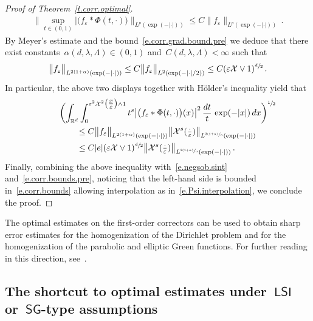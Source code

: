 \documentclass[11pt]{article} %
\numberwithin{equation}{section}
\theoremstyle{definition}
\newcommand*{\R}{\ensuremath{\mathbb{R}}}
\newcommand{\eps}{\varepsilon}
\newcommand{\ep}{\eps}
\newcommand{\X}{\mathcal{X}}
\newcommand{\LSI}{\mathsf{LSI}}
\newcommand{\SG}{\mathsf{SG}}
\begin{document}
\begin{proof}[Proof of Theorem~\ref{t.corr.optimal}]
\begin{align*}  
\Big\| \sup_{t \in (0,1)}  \big| \bigl( f_\ep \ast \Phi(t,\cdot) \bigr) \Big\|_{L^p(\exp(-|\cdot|))} 
\leq 
C \big\| f_\ep \big\|_{L^p(\exp(-|\cdot|))} 
\,.
\end{align*}
By Meyer's estimate and the bound~\eqref{e.corr.grad.bound.pre} we deduce that there exist constants~$\alpha(d,\lambda,\Lambda) \in (0,1)$ and~$C(d,\lambda,\Lambda)<\infty$ such that 
\begin{align*}  
\big\| f_\ep \big\|_{L^{2(1+\alpha)}(\exp(-|\cdot|))} 
\leq 
C \big\| f_\ep \big\|_{L^2(\exp(-|\cdot|/2))}  
\leq
C  ( \ep\X \vee 1 )^{\sfrac d2} 
\,.
\end{align*}
In particular, the above two displays together with H\"older's inequality yield that
\begin{align} \notag  
\lefteqn{
\biggl(  \int_{\R^d} \int_{0}^{\ep^2 \X^2\bigl(\tfrac x\ep\bigr) \wedge 1} t^s   \big| \bigl( f_\ep  \ast \Phi(t,\cdot) \bigr) (x) \big|^2 \, \frac{dt}{t} \, \exp(-|x|) \, dx 
\biggr)^{\sfrac12} 
} \qquad &
\\ 
\notag &
\leq 
C \big\| f_\ep \big\|_{L^{2(1+\alpha)}(\exp(-|\cdot|))} 
\big\| \X^s(\tfrac \cdot\ep) \big\|_{L^{\sfrac{2(1{+}\alpha)}{\alpha} } (\exp(-|\cdot|)) }
\\ 
\notag &
\leq 
C|e| ( \ep\X \vee 1 )^{\sfrac d2} 
\big\| \X^s(\tfrac \cdot\ep) \big\|_{L^{\sfrac{2(1{+}\alpha)}{\alpha} } (\exp(-|\cdot|)) }
\,.
\end{align}
Finally, combining the above inequality with~\eqref{e.negsob.sint} and~\eqref{e.corr.bounds.pre}, noticing that the left-hand side is bounded in~\eqref{e.corr.bounds} allowing interpolation as in~\eqref{e.Psi.interpolation}, we conclude the proof. 
\end{proof}

The optimal estimates on the first-order correctors can be used to obtain sharp error estimates for the homogenization of the Dirichlet problem and for the homogenization of the parabolic and elliptic Green functions. For further reading in this direction, see~\cite[Chapters 6, 8 \& 9]{AKMBook}. 


\subsection{The shortcut to optimal estimates under~\texorpdfstring{$\LSI$}{{LSI}} or~\texorpdfstring{$\SG$}{{SG}}-type assumptions}
\label{s.LSI}
\end{document}
